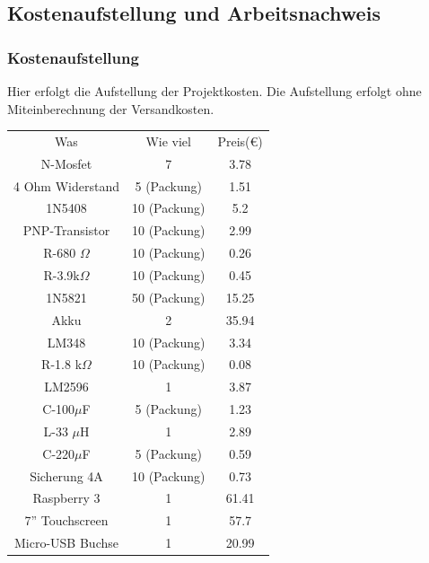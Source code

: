 \documentclass[12pt,a4paper]{article}
\begin{document}
{\newpage
 \subsection{Kostenaufstellung und Arbeitsnachweis}
 
 
 \subsubsection{Kostenaufstellung}
 Hier erfolgt die Aufstellung der Projektkosten. Die Aufstellung erfolgt ohne Miteinberechnung der Versandkosten. \\
  
	\begin{center}
	
	
		\begin{tabular}{|c|c|c|}
		\hline
		 \sc Was & \sc Wie viel &  \sc Preis($\euro$)\\
		\specialrule{2.5pt}{1pt}{1pt}
		N-Mosfet			&		7							&		3.78				\\
		\hline
		4 Ohm Widerstand	&	5 (Packung)				&		1.51				\\
		\hline
		1N5408	 			& 10 (Packung)			&		5.2		\\
		\hline
		PNP-Transistor	&	10 (Packung)			&		2.99	\\
		\hline
		R-680 $\Omega$&	10 (Packung)			&		0.26		\\
		\hline
		R-3.9k$\Omega$	& 10 (Packung)			& 0.45		\\
		\hline
		1N5821				& 50 (Packung)			&	15.25		\\
		\hline
		Akku					&	2								& 35.94				\\
			\hline
		LM348					&		10 (Packung)		& 3.34				\\
			\hline
		R-1.8 k$\Omega$& 10 (Packung)			& 0.08				\\
			\hline
		LM2596				&	1								&	3.87			\\
			\hline
		C-100$\mu$F		&	5 (Packung)				&	1.23			\\
			\hline
		L-33 $\mu$H		&	1								& 2.89				\\
			\hline
		C-220$\mu$F		&	5 (Packung)				&	0.59			\\
			\hline
		Sicherung 4A		&	10 (Packung)			&	0.73			\\
			\hline
		Raspberry 3		&	1								&	61.41			\\
			\hline
		7'' Touchscreen	&	1								&	57.7			\\
			\hline
		Micro-USB Buchse& 1									&	 20.99			\\

\end{tabular}
\end{center}}
\end{document}
